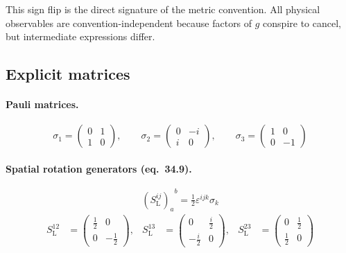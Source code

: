\documentclass[12pt]{article}
\theoremstyle{remark}
\begin{document}
\medskip

\noindent This sign flip is the direct signature of the metric convention.
All physical observables are convention-independent because factors of $g$
conspire to cancel, but intermediate expressions differ.

\subsection{Explicit matrices}

\paragraph{Pauli matrices.}
\begin{equation}
  \sigma_1 = \begin{pmatrix}0 & 1 \\ 1 & 0\end{pmatrix},\qquad
  \sigma_2 = \begin{pmatrix}0 & -i \\ i & 0\end{pmatrix},\qquad
  \sigma_3 = \begin{pmatrix}1 & 0 \\ 0 & -1\end{pmatrix}
  \tag{34.8}
\end{equation}

\paragraph{Spatial rotation generators (eq.~34.9).}
\begin{equation}
  {(S^{ij}_{\mathrm{L}})_a}^b = \tfrac{1}{2}\varepsilon^{ijk}\sigma_k
  \tag{34.9}
\end{equation}
\begin{align*}
  S^{12}_{\mathrm{L}} &= \begin{pmatrix}\tfrac{1}{2} & 0 \\ 0 & -\tfrac{1}{2}\end{pmatrix},&
  S^{13}_{\mathrm{L}} &= \begin{pmatrix}0 & \tfrac{i}{2} \\ -\tfrac{i}{2} & 0\end{pmatrix},&
  S^{23}_{\mathrm{L}} &= \begin{pmatrix}0 & \tfrac{1}{2} \\ \tfrac{1}{2} & 0\end{pmatrix}
\end{align*}
\end{document}
